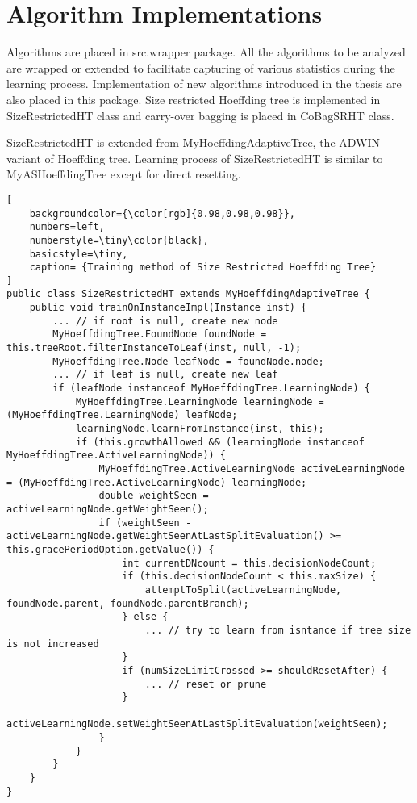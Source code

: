 \section*{Algorithm Implementations}
Algorithms are placed in src.wrapper package. All the algorithms to be analyzed are wrapped or extended to facilitate capturing of various statistics during the learning process. Implementation of new algorithms introduced in the thesis are also placed in this package. Size restricted Hoeffding tree is implemented in SizeRestrictedHT class and carry-over bagging is placed in CoBagSRHT class. 

SizeRestrictedHT is extended from MyHoeffdingAdaptiveTree, the ADWIN variant of Hoeffding tree. Learning process of SizeRestrictedHT is similar to MyASHoeffdingTree except for direct resetting.
\begin{lstlisting}[
    backgroundcolor={\color[rgb]{0.98,0.98,0.98}},
    numbers=left,
    numberstyle=\tiny\color{black},
    basicstyle=\tiny,
    caption= {Training method of Size Restricted Hoeffding Tree}
]
public class SizeRestrictedHT extends MyHoeffdingAdaptiveTree {
    public void trainOnInstanceImpl(Instance inst) {
        ... // if root is null, create new node
        MyHoeffdingTree.FoundNode foundNode = this.treeRoot.filterInstanceToLeaf(inst, null, -1);
        MyHoeffdingTree.Node leafNode = foundNode.node;
        ... // if leaf is null, create new leaf
        if (leafNode instanceof MyHoeffdingTree.LearningNode) {
            MyHoeffdingTree.LearningNode learningNode = (MyHoeffdingTree.LearningNode) leafNode;
            learningNode.learnFromInstance(inst, this);
            if (this.growthAllowed && (learningNode instanceof MyHoeffdingTree.ActiveLearningNode)) {
                MyHoeffdingTree.ActiveLearningNode activeLearningNode = (MyHoeffdingTree.ActiveLearningNode) learningNode;
                double weightSeen = activeLearningNode.getWeightSeen();
                if (weightSeen - activeLearningNode.getWeightSeenAtLastSplitEvaluation() >= this.gracePeriodOption.getValue()) {
                    int currentDNcount = this.decisionNodeCount;
                    if (this.decisionNodeCount < this.maxSize) {
                        attemptToSplit(activeLearningNode, foundNode.parent, foundNode.parentBranch);
                    } else {
                        ... // try to learn from isntance if tree size is not increased
                    }
                    if (numSizeLimitCrossed >= shouldResetAfter) {
                        ... // reset or prune
                    }
                    activeLearningNode.setWeightSeenAtLastSplitEvaluation(weightSeen);
                }
            }
        }
    }
}
\end{lstlisting}
